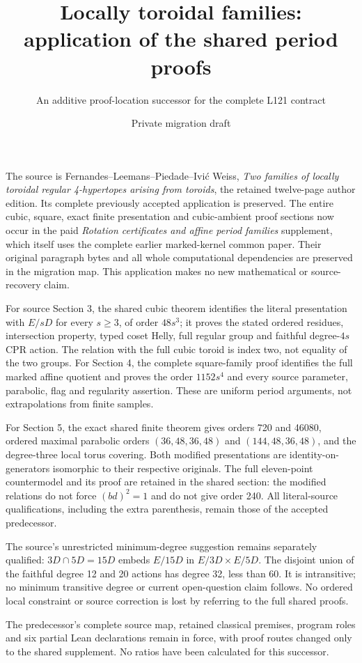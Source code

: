 \documentclass[11pt,a4paper]{article}
\title{Locally toroidal families: application of the shared period proofs}
\author{An additive proof-location successor for the complete L121 contract}
\date{Private migration draft}
\begin{document}
\maketitle
The source is Fernandes--Leemans--Piedade--Ivi\'c Weiss,
\emph{Two families of locally toroidal regular 4-hypertopes arising from
toroids}, the retained twelve-page author edition. Its complete previously
accepted application is preserved. The entire cubic, square, exact finite
presentation and cubic-ambient proof sections now occur in the paid
\emph{Rotation certificates and affine period families} supplement,
which itself uses the complete earlier marked-kernel common paper.
Their original paragraph bytes and all whole computational dependencies
are preserved in the migration map. This application makes no new
mathematical or source-recovery claim.

For source Section 3, the shared cubic theorem identifies the literal
presentation with $E/sD$ for every $s\ge3$, of order $48s^3$; it proves
the stated ordered residues, intersection property, typed coset Helly,
full regular group and faithful degree-$4s$ CPR action. The relation
with the full cubic toroid is index two, not equality of the two groups.
For Section 4, the complete square-family proof identifies the full
marked affine quotient and proves the order $1152s^4$ and every source
parameter, parabolic, flag and regularity assertion. These are uniform
period arguments, not extrapolations from finite samples.

For Section 5, the exact shared finite theorem gives orders 720 and 46080,
ordered maximal parabolic orders $(36,48,36,48)$ and
$(144,48,36,48)$, and the degree-three local torus covering. Both modified
presentations are identity-on-generators isomorphic to their respective
originals. The full eleven-point countermodel and its proof are retained
in the shared section: the modified relations do not force $(bd)^2=1$
and do not give order 240. All literal-source qualifications, including
the extra parenthesis, remain those of the accepted predecessor.

The source's unrestricted minimum-degree suggestion remains separately
qualified: $3D\cap5D=15D$ embeds $E/15D$ in $E/3D\times E/5D$.
The disjoint union of the faithful degree 12 and 20 actions has degree 32,
less than 60. It is intransitive; no minimum transitive degree or current
open-question claim follows. No ordered local constraint or source
correction is lost by referring to the full shared proofs.

The predecessor's complete source map, retained classical premises,
program roles and six partial Lean declarations remain in force, with
proof routes changed only to the shared supplement. No ratios have
been calculated for this successor.
\end{document}
